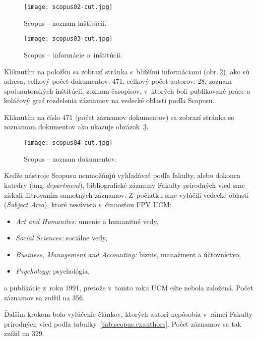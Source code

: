 \begin{figure}
  \centering
  \texttt{[image: scopus02-cut.jpg]}
  \caption{Scopus -- zoznam inštitúcií.}
  \label{fig:scopus.institutionlist}
\end{figure}

\begin{figure}
  \centering
  \texttt{[image: scopus03-cut.jpg]}
  \caption{Scopus -- informácie o~inštitúcii.}
  \label{fig:scopus.institutioninfo}
\end{figure}

Kliknutím na položku sa zobrazí stránka s~bližšími informáciami
(obr.\,\ref{fig:scopus.institutioninfo}), ako sú adresa, celkový počet
dokumentov: 471, celkový počet autorov: 28, zoznam spoluautorských inštitúcii,
zoznam časopisov, v~ktorých boli publikované práce a koláčový graf rozdelenia
záznamov na vedecké oblasti podľa Scopusu.

Kliknutím na číslo 471 (počet záznamov dokumentov) sa zobrazí stránka so
zoznamom dokumentov ako ukazuje obrázok~\ref{fig:scopus.documentlist}.

\begin{figure}
  \centering
  \texttt{[image: scopus04-cut.jpg]}
  \caption{Scopus -- zoznam dokumentov.}
  \label{fig:scopus.documentlist}
\end{figure}

Keďže nástroje Scopusu neumožňujú vyhľadávať podľa fakulty, alebo dokonca
katedry (ang.\,\emph{department}), bibliografické záznamy Fakulty prírodných
vied sme získali filtrovaním samotných záznamov.  Z~počiatku sme vylúčili
vedecké oblasti (\emph{Subject Area}), ktoré nesúvisia s~činnosťou FPV UCM:
\begin{itemize}
\item \emph{Art and Humanites:} umenie a humanitné vedy,
\item \emph{Social Sciences:} sociálne vedy,
\item \emph{Business, Management and Accounting:} biznis, manažment a
  účtovníctvo,
\item \emph{Psychology:} psychológia,
\end{itemize}
a publikácie z~roku 1991, pretože v~tomto roku UCM ešte nebola založená.  Počet
záznamov sa znížil na 356.

Ďalším krokom bolo vylúčenie článkov, ktorých autori nepôsobia v~rámci Fakulty
prírodných vied podľa tabuľky~\ref{tab:scopus.exauthors}.  Počet záznamov sa tak
znížil na 329.

